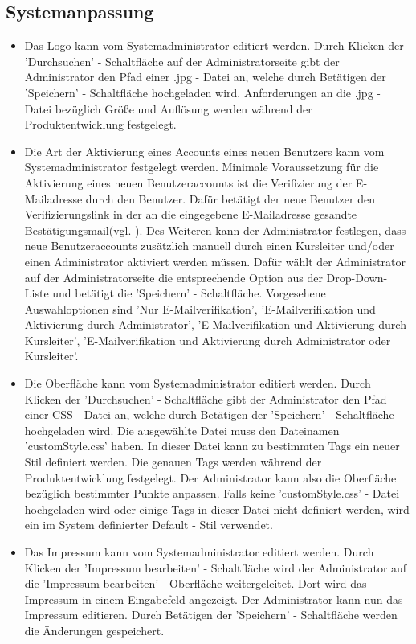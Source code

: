 \documentclass[a4paper]{scrreprt}
\begin{document}
		\subsection{Systemanpassung}
			\begin{itemize}
				\item {}
					Das Logo kann vom Systemadministrator editiert werden. Durch Klicken der 'Durchsuchen' - Schaltfläche auf der Administratorseite gibt der Administrator den Pfad einer .jpg - Datei an, welche durch Betätigen der 'Speichern' - Schaltfläche hochgeladen wird. Anforderungen an die .jpg - Datei bezüglich Größe und Auflösung werden während der Produktentwicklung festgelegt.
				\item {}
					Die Art der Aktivierung eines Accounts eines neuen Benutzers kann vom Systemadministrator festgelegt werden. Minimale Voraussetzung für die Aktivierung eines neuen Benutzeraccounts ist die Verifizierung der E-Mailadresse durch den Benutzer. Dafür betätigt der neue Benutzer den Verifizierungslink in der an die eingegebene E-Mailadresse gesandte Bestätigungsmail(vgl. ). Des Weiteren kann der Administrator festlegen, dass neue Benutzeraccounts zusätzlich manuell durch einen Kursleiter und/oder einen Administrator aktiviert werden müssen. Dafür wählt der Administrator auf der Administratorseite die entsprechende Option aus der Drop-Down-Liste und betätigt die 'Speichern' - Schaltfläche. Vorgesehene Auswahloptionen sind 'Nur E-Mailverifikation', 'E-Mailverifikation und Aktivierung durch Administrator', 'E-Mailverifikation und Aktivierung durch Kursleiter', 'E-Mailverifikation und Aktivierung durch Administrator oder Kursleiter'.
				\item {}
					Die Oberfläche kann vom Systemadministrator editiert werden. Durch Klicken der 'Durchsuchen' - Schaltfläche gibt der Administrator den Pfad einer \gls{CSS} - Datei an, welche durch Betätigen der 'Speichern' - Schaltfläche hochgeladen wird. Die ausgewählte Datei muss den Dateinamen 'customStyle.css' haben. In dieser Datei kann zu bestimmten Tags ein neuer Stil definiert werden. 
					Die genauen Tags werden während der Produktentwicklung festgelegt. Der Administrator kann also die Oberfläche bezüglich bestimmter Punkte anpassen.  
					Falls keine 'customStyle.css' - Datei hochgeladen wird oder einige Tags in dieser Datei nicht definiert werden, wird ein im System definierter Default - Stil verwendet.
				\item {}
					Das Impressum kann vom Systemadministrator editiert werden. Durch Klicken der 'Impressum bearbeiten' - Schaltfläche wird der Administrator auf die 'Impressum bearbeiten' - Oberfläche weitergeleitet. Dort wird das Impressum in einem Eingabefeld angezeigt. Der Administrator kann nun das Impressum editieren. Durch Betätigen der 'Speichern' - Schaltfläche werden die Änderungen gespeichert.  				
			\end{itemize}
		
\end{document}
